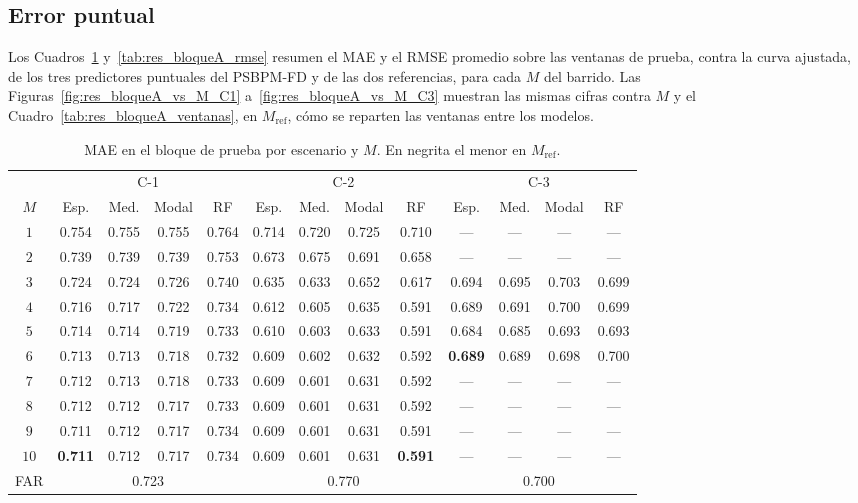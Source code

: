 \subsection{Error puntual}
\label{03_08_01_error_puntual}

Los Cuadros~\ref{tab:res_bloqueA} y~\ref{tab:res_bloqueA_rmse} resumen el MAE y el RMSE promedio sobre las ventanas de prueba, contra la curva ajustada, de los tres predictores puntuales del PSBPM-FD y de las dos referencias, para cada $M$ del barrido. Las Figuras~\ref{fig:res_bloqueA_vs_M_C1} a~\ref{fig:res_bloqueA_vs_M_C3} muestran las mismas cifras contra $M$ y el Cuadro~\ref{tab:res_bloqueA_ventanas}, en $M_{\mathrm{ref}}$, cómo se reparten las ventanas entre los modelos.

\begin{table}[H]
\centering\small
\setlength{\tabcolsep}{3.5pt}
\caption{MAE en el bloque de prueba por escenario y $M$. En negrita el menor en $M_{\mathrm{ref}}$.}
\label{tab:res_bloqueA}
\begin{tabular}{c cccc cccc cccc}
\hline
 & \multicolumn{4}{c}{C-1} & \multicolumn{4}{c}{C-2} & \multicolumn{4}{c}{C-3} \\
$M$ & Esp. & Med. & Modal & RF & Esp. & Med. & Modal & RF & Esp. & Med. & Modal & RF \\
\hline
$1$  & 0.754 & 0.755 & 0.755 & 0.764 & 0.714 & 0.720 & 0.725 & 0.710 & --- & --- & --- & --- \\
$2$  & 0.739 & 0.739 & 0.739 & 0.753 & 0.673 & 0.675 & 0.691 & 0.658 & --- & --- & --- & --- \\
$3$  & 0.724 & 0.724 & 0.726 & 0.740 & 0.635 & 0.633 & 0.652 & 0.617 & 0.694 & 0.695 & 0.703 & 0.699 \\
$4$  & 0.716 & 0.717 & 0.722 & 0.734 & 0.612 & 0.605 & 0.635 & 0.591 & 0.689 & 0.691 & 0.700 & 0.699 \\
$5$  & 0.714 & 0.714 & 0.719 & 0.733 & 0.610 & 0.603 & 0.633 & 0.591 & 0.684 & 0.685 & 0.693 & 0.693 \\
$6$  & 0.713 & 0.713 & 0.718 & 0.732 & 0.609 & 0.602 & 0.632 & 0.592 & \textbf{0.689} & 0.689 & 0.698 & 0.700 \\
$7$  & 0.712 & 0.713 & 0.718 & 0.733 & 0.609 & 0.601 & 0.631 & 0.592 & --- & --- & --- & --- \\
$8$  & 0.712 & 0.712 & 0.717 & 0.733 & 0.609 & 0.601 & 0.631 & 0.592 & --- & --- & --- & --- \\
$9$  & 0.711 & 0.712 & 0.717 & 0.734 & 0.609 & 0.601 & 0.631 & 0.591 & --- & --- & --- & --- \\
$10$ & \textbf{0.711} & 0.712 & 0.717 & 0.734 & 0.609 & 0.601 & 0.631 & \textbf{0.591} & --- & --- & --- & --- \\
\hline
FAR & \multicolumn{4}{c}{0.723} & \multicolumn{4}{c}{0.770} & \multicolumn{4}{c}{0.700} \\
\hline
\end{tabular}
\end{table}

